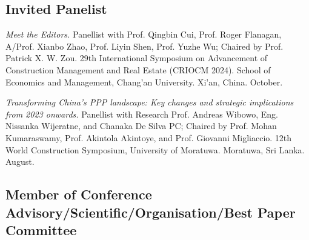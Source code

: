 \documentclass[11pt,a4paper]{report} %
\begin{document}
    \subsection*{Invited Panelist}

    \begin{tablist}

        \item[2024] \tab{}\textit{Meet the Editors.} Panellist with Prof. Qingbin Cui, Prof. Roger Flanagan, A/Prof. Xianbo Zhao, Prof. Liyin Shen, Prof. Yuzhe Wu; Chaired by Prof. Patrick X. W. Zou. 29th International Symposium on Advancement of Construction Management and Real Estate (CRIOCM 2024). School of Economics and Management, Chang'an University. Xi'an, China. October.

        \item[2024] \tab{}\textit{Transforming China's PPP landscape: Key changes and strategic implications from 2023 onwards.} Panellist with Research Prof. Andreas Wibowo, Eng. Nissanka Wijeratne, and Chanaka De Silva PC; Chaired by Prof.  Mohan Kumaraswamy, Prof. Akintola Akintoye, and Prof. Giovanni Migliaccio. 12th World Construction Symposium, University of Moratuwa. Moratuwa, Sri Lanka. August.

    \end{tablist}

    \subsection*{Member of Conference Advisory/Scientific/Organisation/Best Paper Committee}
\end{document}
